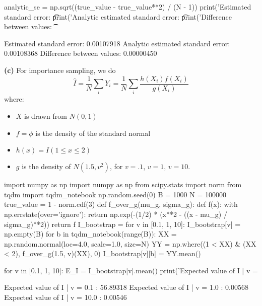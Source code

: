 \begin{python}
analytic_se = np.sqrt((true_value - true_value**2) / (N - 1))
print('Estimated standard error: \t\t %
print('Analytic estimated standard error: \t %
print('Difference between values: \t\t %
\end{python}
\begin{console}
Estimated standard error:                0.00107918
Analytic estimated standard error:       0.00108368
Difference between values:               0.00000450
    \end{console}
\textbf{(c)} For importance sampling, we do
\[
\hat{I} = \frac{1}{N} \sum_{i} Y_{i} = \frac{1}{N} \sum_{i} \frac{h(X_{i}) f(X_{i})}{g(X_{i})}
\]
where:
\begin{itemize}[tightlist]
\item
  \(X\) is drawn from \(N(0, 1)\)
\item
  \(f = \phi\) is the density of the standard normal
\item
  \(h(x) = I(1 \leq x \leq 2)\)
\item
  \(g\) is the density of \(N(1.5, v^{2})\), for \(v = .1\), \(v = 1\),
  \(v = 10\).
\end{itemize}

\begin{python}
import numpy as np
import numpy as np
from scipy.stats import norm
from tqdm import tqdm_notebook
np.random.seed(0)
B = 1000
N = 100000
true_value = 1 - norm.cdf(3)
def f_over_g(mu_g, sigma_g):
    def f(x):
        with np.errstate(over='ignore'):
            return np.exp(-(1/2) * (x**2 - ((x - mu_g) / sigma_g)**2))
    return f
I_bootstrap = {}
for v in [0.1, 1, 10]:    
    I_bootstrap[v] = np.empty(B)
    for b in tqdm_notebook(range(B)):
        XX = np.random.normal(loc=4.0, scale=1.0, size=N)
        YY = np.where((1 < XX) & (XX < 2), f_over_g(1.5, v)(XX), 0)
        I_bootstrap[v][b] = YY.mean()
\end{python}

\begin{python}
for v in [0.1, 1, 10]:
    E_I = I_bootstrap[v].mean()
    print('Expected value of I | v = %
\end{python}
\begin{console}
Expected value of I | v = 0.1 :          56.89318
Expected value of I | v = 1.0 :          0.00568
Expected value of I | v = 10.0 :         0.00546
\end{console}

